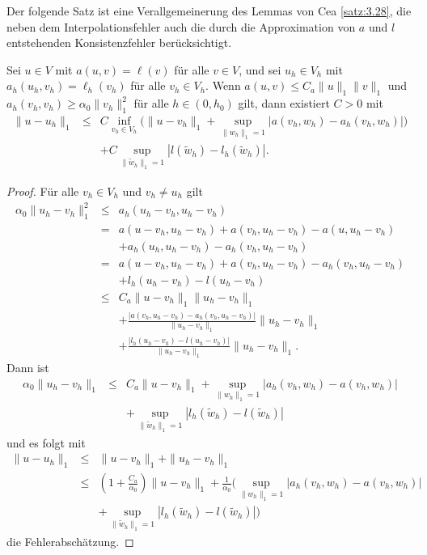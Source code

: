 Der folgende Satz ist eine Verallgemeinerung des Lemmas von Cea \eqref{satz:3.28}, die neben dem
Interpolationsfehler auch die durch die Approximation von $a$ und $l$ entstehenden Konsistenzfehler berücksichtigt.
\begin{Lemma}
    \label{lem:4.10}
    Sei $u\in V$ mit $a(u,v) = \ell(v)$ für alle $v\in V$, und sei $u_h\in V_h$
    mit $a_h(u_h,v_h) = \ell_h(v_h)$ für alle $v_h\in V_h$.
    Wenn $a(u,v) \le C_a \| u\|_1\|v\|_1 $ und $a_h(v_h,v_h) \ge \alpha_0 
    \|v_h\|_1^2$ für alle $h\in (0,h_0)$ gilt, dann existiert $C>0$ mit
    \begin{eqnarray*}
              \|u - u_h\|_1
        &\le& C \inf_{v_h\in V_h}\Big(\| u - v_h\|_1
              + \sup_{\|w_h\|_1=1} |a(v_h, w_h) - a_h(v_h, w_h)| \Big)\\
              &&+ C\sup_{\|\tilde w_h\|_1 = 1} |l(\tilde w_h) - l_h(\tilde w_h)|.
    \end{eqnarray*}
\end{Lemma}


\begin{proof}
    Für alle $v_h\in V_h$ und $v_h \neq u_h$ gilt
    \begin{eqnarray*}
              \alpha_0 \|u_h - v_h\|_1^2
        &\le& a_h(u_h - v_h, u_h - v_h) \\
        &=& a(u - v_h, u_h - v_h) + a(v_h, u_h - v_h) - a(u, u_h - v_h) \\
          &&+ a_h(u_h, u_h - v_h) - a_h(v_h, u_h - v_h) \\
        &=& a(u - v_h, u_h - v_h) + a(v_h, u_h - v_h) - a_h(v_h, u_h - v_h) \\
          &&+ l_h(u_h - v_h) - l(u_h - v_h) \\
        &\le& C_a \|u - v_h\|_1 \|u_h - v_h\|_1 \\
          &&+ \frac{|a(v_h, u_h - v_h) - a_h(v_h, u_h - v_h)|}{\|u_h - v_h\|_1}
              \|u_h - v_h\|_1 \\
          &&+ \frac{|l_h(u_h - v_h) - l(u_h - v_h)|}{\|u_h - v_h\|_1}
              \|u_h - v_h\|_1.
    \end{eqnarray*}
    Dann ist
    \begin{eqnarray*}
              \alpha_0 \|u_h - v_h\|_1
        &\le& C_a \|u - v_h\|_1 +
              \sup_{\|w_h\|_1 = 1} |a_h(v_h, w_h) - a(v_h, w_h)| \\
          &&+ \sup_{\|\tilde w_h\|_1 = 1} |l_h(\tilde w_h) - l(\tilde w_h)|
    \end{eqnarray*}
    und es folgt mit
    \begin{eqnarray*}
              \|u - u_h\|_1
        &\le& \|u - v_h\|_1 + \|u_h - v_h\|_1 \\
        &\le& \left(1 + \frac{C_a}{\alpha_0}\right) \|u - v_h\|_1
              + \frac{1}{\alpha_0} \Biggl(\sup_{\|w_h\|_1 = 1}
              |a_h(v_h, w_h) - a(v_h, w_h)| \\
          &&+ \sup_{\|\tilde w_h\|_1 = 1} |l_h(\tilde w_h) - l(\tilde w_h)|
              \Biggr)
    \end{eqnarray*}
    die Fehlerabschätzung.
\end{proof}


